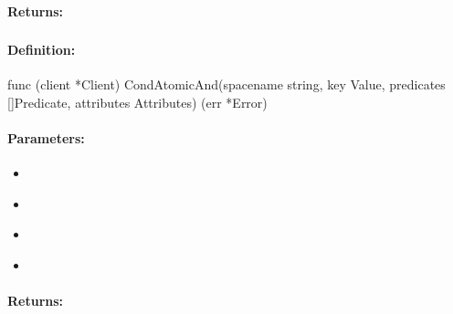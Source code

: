 \paragraph{Returns:}


\pagebreak
\subsubsection{}
\label{api:Go:CondAtomicAnd}


\paragraph{Definition:}
\begin{gocode}
func (client *Client) CondAtomicAnd(spacename string, key Value, predicates []Predicate, attributes Attributes) (err *Error)
\end{gocode}

\paragraph{Parameters:}
\begin{itemize}[noitemsep]
\item {}\\

\item {}\\

\item {}\\

\item {}\\

\end{itemize}

\paragraph{Returns:}


\pagebreak
\subsubsection{}
\label{api:Go:GroupAtomicAnd}


